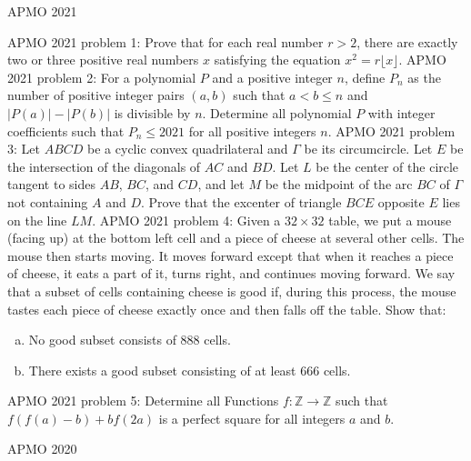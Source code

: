 
APMO 2021 

APMO 2021 problem 1:  Prove that for each real number $r>2$, there are exactly two or three positive real numbers $x$ satisfying the equation $x^2=r\lfloor x \rfloor$. 
APMO 2021 problem 2:  For a polynomial $P$ and a positive integer $n$, define $P_n$ as the number of positive integer pairs $(a,b)$ such that $a<b \leq n$ and $|P(a)|-|P(b)|$ is divisible by $n$. Determine all polynomial $P$ with integer coefficients such that $P_n \leq 2021$ for all positive integers $n$. 
APMO 2021 problem 3:  Let $ABCD$ be a cyclic convex quadrilateral and $\Gamma$ be its circumcircle. Let $E$ be the intersection of the diagonals of $AC$ and $BD$. Let $L$ be the center of the circle tangent to sides $AB$, $BC$, and $CD$, and let $M$ be the midpoint of the arc $BC$ of $\Gamma$ not containing $A$ and $D$. Prove that the excenter of triangle $BCE$ opposite $E$ lies on the line $LM$. 
APMO 2021 problem 4:  Given a $32 \times 32$ table, we put a mouse (facing up) at the bottom left cell and a piece of cheese at several other cells.  The mouse then starts moving.  It moves forward except that when it reaches a piece of cheese, it eats a part of it, turns right, and continues moving forward.  We say that a subset of cells containing cheese is good if, during this process, the mouse tastes each piece of cheese exactly once and then falls off the table.  Show that:
\begin{enumerate}[(a)]
  \item No good subset consists of 888 cells.
  \item There exists a good subset consisting of at least 666 cells.
\end{enumerate} 
APMO 2021 problem 5:  Determine all Functions $f:\mathbb{Z} \to \mathbb{Z}$ such that $f(f(a)-b)+bf(2a)$ is a perfect square for all integers $a$ and $b$. 

APMO 2020 

